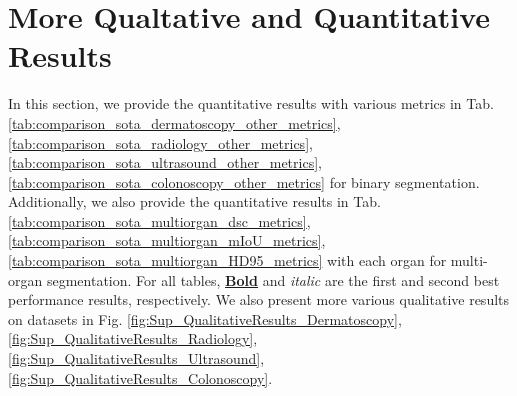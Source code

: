 \section{More Qualtative and Quantitative Results}
In this section, we provide the quantitative results with various metrics in Tab. \ref{tab:comparison_sota_dermatoscopy_other_metrics}, \ref{tab:comparison_sota_radiology_other_metrics}, \ref{tab:comparison_sota_ultrasound_other_metrics}, \ref{tab:comparison_sota_colonoscopy_other_metrics} for binary segmentation. Additionally, we also provide the quantitative results in Tab. \ref{tab:comparison_sota_multiorgan_dsc_metrics}, \ref{tab:comparison_sota_multiorgan_mIoU_metrics}, \ref{tab:comparison_sota_multiorgan_HD95_metrics} with each organ for multi-organ segmentation. For all tables, \textbf{\underline{Bold}} and \textit{italic} are the first and second best performance results, respectively. We also present more various qualitative results on datasets in Fig. \ref{fig:Sup_QualitativeResults_Dermatoscopy}, \ref{fig:Sup_QualitativeResults_Radiology}, \ref{fig:Sup_QualitativeResults_Ultrasound}, \ref{fig:Sup_QualitativeResults_Colonoscopy}.

